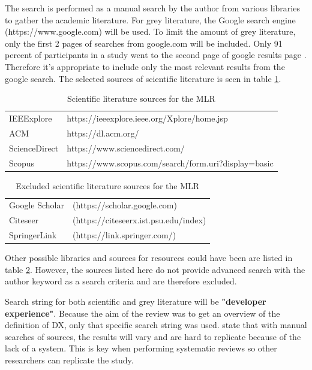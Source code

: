 \documentclass[english, 12pt, a4paper, sci, utf8, a-1b, online]{aaltothesis}
\newcounter{subsubsubsection}[subsubsection]
\begin{document}

The search is performed as a manual search by the author from various libraries to gather the academic literature. For grey literature, the Google search engine (https://www.google.com) will be used. To limit the amount of grey literature, only the first 2 pages of searches from google.com will be included. Only 91 percent of participants in a study went to the second page of google results page \citep{google-search}. Therefore it's appropriate to include only the most relevant results from the google search. The selected sources of scientific literature is seen in table \ref{table:included-sources}.

\begin{table}
  \centering
  \begin{tabular}{ l l }
    \hline
    IEEExplore    & https://ieeexplore.ieee.org/Xplore/home.jsp          \\
    ACM           & https://dl.acm.org/                                  \\
    ScienceDirect & https://www.sciencedirect.com/                       \\
    Scopus        & https://www.scopus.com/search/form.uri?display=basic \\
    \hline
  \end{tabular}
  \caption{Scientific literature sources for the MLR}
  \label{table:included-sources}
\end{table}

\begin{table}
  \centering
  \begin{tabular}{ l l }
    \hline
    Google Scholar & (https://scholar.google.com)          \\
    Citeseer       & (https://citeseerx.ist.psu.edu/index) \\
    SpringerLink   & (https://link.springer.com/)          \\
    \hline
  \end{tabular}
  \caption{Excluded scientific literature sources for the MLR}
  \label{table:excluded-sources}
\end{table}

Other possible libraries and sources for resources could have been are listed in table \ref{table:excluded-sources}. However, the sources listed here do not provide advanced search with the author keyword as a search criteria and are therefore excluded.

Search string for both scientific and grey literature will be \textbf{"developer experience"}. Because the aim of the review was to get an overview of the definition of DX, only that specific search string was used. \cite{guidelines-for-snowballing} state that with manual searches of sources, the results will vary and are hard to replicate because of the lack of a system. This is key when performing systematic reviews so other researchers can replicate the study.
\end{document}
